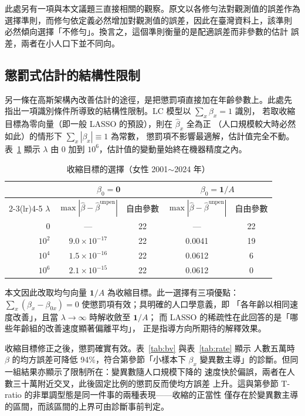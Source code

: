 \documentclass[UTF8, fontset=macnew, a4paper, 12pt]{ctexart}
\begin{document}
此處另有一項與本文議題三直接相關的觀察。原文以各修勻法對觀測值的誤差作為
選擇準則，而修勻依定義必然增加對觀測值的誤差，因此在臺灣資料上，該準則
必然傾向選擇「不修勻」。換言之，這個準則衡量的是配適誤差而非參數的估計
誤差，兩者在小人口下並不同向。

\subsection{懲罰式估計的結構性限制}

另一條在高斯架構內改善估計的途徑，是把懲罰項直接加在年齡參數上。此處先
指出一項識別條件所導致的結構性限制。LC 模型以 $\sum_x\beta_x=1$ 識別，
若取收縮目標為零向量（即一般 LASSO 的預設），則在 $\hat\beta_x$ 全為正
（人口規模較大時必然如此）的情形下 $\sum_x|\beta_x|\equiv1$ 為常數，
懲罰項不影響最適解，估計值完全不動。表~\ref{tab:shrink} 顯示 $\lambda$ 由
0 加到 $10^6$，估計值的變動量始終在機器精度之內。

\begin{table}[H]
\centering
\caption{收縮目標的選擇（女性 2001$\sim$2024 年）}
\small
\begin{tabular}{rcccc}
\toprule
& \multicolumn{2}{c}{$\beta_0=\mathbf{0}$} & \multicolumn{2}{c}{$\beta_0=\mathbf{1}/A$}\\
\cmidrule(lr){2-3}\cmidrule(lr){4-5}
$\lambda$ & $\max|\hat\beta-\hat\beta^{\text{unpen}}|$ & 自由參數 &
            $\max|\hat\beta-\hat\beta^{\text{unpen}}|$ & 自由參數\\
\midrule
$0$      & --- & 22 & --- & 22\\
$10^2$   & $9.0\times10^{-17}$ & 22 & 0.0041 & 19\\
$10^4$   & $1.5\times10^{-16}$ & 22 & 0.0612 & 6\\
$10^6$   & $2.1\times10^{-15}$ & 22 & 0.0612 & 0\\
\bottomrule
\end{tabular}
\label{tab:shrink}
\end{table}

本文因此改取均勻向量 $\mathbf{1}/A$ 為收縮目標。此一選擇有三項優點：
$\sum_x(\beta_x-\beta_{0x})=0$ 使懲罰項有效；具明確的人口學意義，即
「各年齡以相同速度改善」，且當 $\lambda\to\infty$ 時解收斂至 $\mathbf{1}/A$；
而 LASSO 的稀疏性在此回答的是「哪些年齡組的改善速度顯著偏離平均」，
正是指導方向所期待的解釋效果。

收縮目標修正之後，懲罰確實有效。表~\ref{tab:bv} 與表~\ref{tab:rate} 顯示
人數五萬時 $\beta$ 的均方誤差可降低 94\%，符合第參節「小樣本下 $\beta_x$
變異數主導」的診斷。但同一組結果亦顯示了限制所在：變異數隨人口規模下降的
速度快於偏誤，兩者在人數三十萬附近交叉，此後固定比例的懲罰反而使均方誤差
上升。這與第參節 T-ratio 的非單調型態是同一件事的兩種表現——收縮的正當性
僅存在於變異數主導的區間，而該區間的上界可由診斷事前判定。
\end{document}
